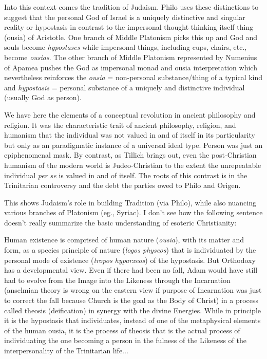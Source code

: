 \begin{quotationx}
Into this context comes the tradition of Judaism. Philo uses these distinctions to suggest that the personal God of Israel is a uniquely distinctive and singular reality or hypostasis in contrast to the impersonal thought thinking itself thing (ousia) of Aristotle. One branch of Middle Platonism picks this up and God and souls become \emph{hypostases} while impersonal things, including cups, chairs, etc., become \emph{ousias}. The other branch of Middle Platonism represented by Numenius of Apamea pushes the God as impersonal monad and ousia interpretation which nevertheless reinforces the \emph{ousia} = non-personal substance/thing of a typical kind and \emph{hypostasis} = personal substance of a uniquely and distinctive individual (usually God as person).

We have here the elements of a conceptual revolution in ancient philosophy and religion. It was the characteristic trait of ancient philosophy, religion, and humanism that the individual was not valued in and of itself in its particularity but only as an paradigmatic instance of a universal ideal type. Person was just an epiphenomenal mask. By contrast, as Tillich brings out, even the post-Christian humanism of the modern world is Judeo-Christian to the extent the unrepeatable individual \emph{per se} is valued in and of itself. The roots of this contrast is in the Trinitarian controversy and the debt the parties owed to Philo and Origen.
\end{quotationx}

This shows Judaism's role in building Tradition (via Philo), while also nuancing various branches of Platonism (eg., Syriac). I don't see how the following sentence doesn't really summarize the basic understanding of esoteric Christianity:

\begin{quotex}
Human existence is comprised of human nature (\emph{ousia}), with its matter and form, as a species principle of nature (\emph{logos physeos}) that is individuated by the personal mode of existence (\emph{tropos hyparxeos}) of the hypostasis. But Orthodoxy has a developmental view. Even if there had been no fall, Adam would have still had to evolve from the Image into the Likeness through the Incarnation (anselmian theory is wrong on the eastern view if purpose of Incarnation was just to correct the fall because Church is the goal as the Body of Christ) in a process called theosis (deification) in synergy with the divine Energies. While in principle it is the hypostasis that individuates, instead of one of the metaphysical elements of the human ousia, it is the process of theosis that is the actual process of individuating the one becoming a person in the fulness of the Likeness of the interpersonality of the Trinitarian life...
\end{quotex}

